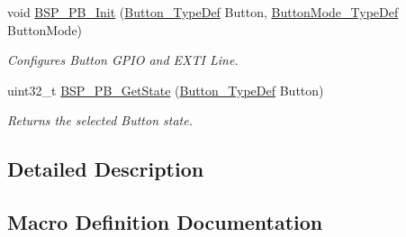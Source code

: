 \begin{DoxyCompactItemize}
void \hyperlink{group__B-L072Z-LRWAN1__LOW__LEVEL__Private__Defines_gad31c8db50a71c1f6dbfe132d72ba0bc6}{B\+S\+P\+\_\+\+P\+B\+\_\+\+Init} (\hyperlink{group__B-L072Z-LRWAN1__LOW__LEVEL__Exported__Types_ga643816dfbad5c734fc25a29ce8d35bb1}{Button\+\_\+\+Type\+Def} Button, \hyperlink{group__B-L072Z-LRWAN1__LOW__LEVEL__Exported__Types_ga48825b7c7d851c440ef8e808fd9d8f0a}{Button\+Mode\+\_\+\+Type\+Def} Button\+Mode)
\begin{DoxyCompactList}\small\item\em Configures Button G\+P\+IO and E\+X\+TI Line. \end{DoxyCompactList}\item 
uint32\+\_\+t \hyperlink{group__B-L072Z-LRWAN1__LOW__LEVEL__Private__Defines_ga8f0978b6cffda9c67266ddfdb3a0abf7}{B\+S\+P\+\_\+\+P\+B\+\_\+\+Get\+State} (\hyperlink{group__B-L072Z-LRWAN1__LOW__LEVEL__Exported__Types_ga643816dfbad5c734fc25a29ce8d35bb1}{Button\+\_\+\+Type\+Def} Button)
\begin{DoxyCompactList}\small\item\em Returns the selected Button state. \end{DoxyCompactList}\end{DoxyCompactItemize}


\subsection{Detailed Description}


\subsection{Macro Definition Documentation}
\mbox{\label{group__B-L072Z-LRWAN1__LOW__LEVEL__Private__Defines_ga62f40f0f53b1c1d1f0aaaa7fb0b63d5f}} 

